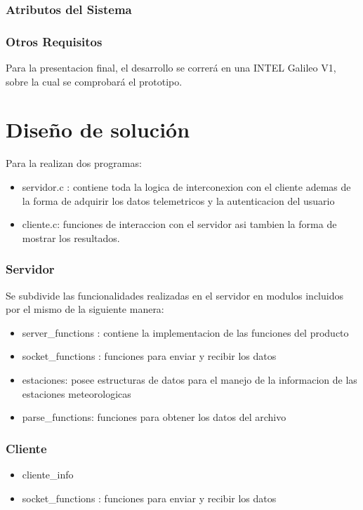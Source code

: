 \documentclass[10pt, a4paper,notitlepage]{article}
\begin{document}
\subsubsection{Atributos del Sistema}
\subsubsection{Otros Requisitos }
Para la presentacion final, el desarrollo se correrá en una INTEL Galileo V1, sobre la cual se comprobará el prototipo.
\section{ Diseño de solución}
Para la realizan dos programas:
\begin{itemize}
	\item servidor.c : contiene toda la logica de interconexion con el cliente ademas de la forma de adquirir los datos telemetricos y la autenticacion del usuario
	\item cliente.c: funciones de interaccion con el servidor asi tambien la forma de mostrar los resultados.
\end{itemize}

\subsubsection{Servidor}
Se subdivide las funcionalidades realizadas en el servidor en modulos incluidos por el mismo de la siguiente manera:
\begin{itemize}
	\item server\_functions : contiene la implementacion de las funciones del producto
	\item socket\_functions : funciones para enviar y recibir los datos
	\item estaciones: posee estructuras de datos para el manejo de la informacion de las estaciones meteorologicas
	\item parse\_functions: funciones para obtener los datos del archivo
\end{itemize}
\subsubsection{Cliente}
\begin{itemize}
	\item cliente\_info
	\item socket\_functions : funciones para enviar y recibir los datos
\end{itemize}
\end{document}
